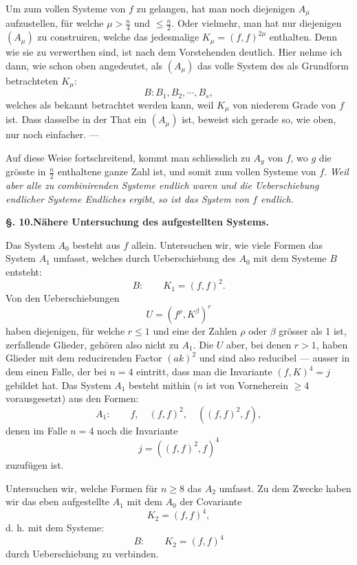 \documentclass[10pt]{article}
\providecommand{\bdots}{\cdots}
\begin{document}
Um zum vollen Systeme von $f$ zu gelangen, hat man noch diejenigen $A_\mu$ aufzustellen, für welche $\mu>\frac n4$ und $\leq\frac n2$. Oder vielmehr, man hat nur diejenigen $(A_\mu)$ zu construiren, welche das jedesmalige $K_\mu=(f,f)^{2\mu}$ enthalten. Denn wie sie zu verwerthen sind, ist nach dem Vorstehenden deutlich. Hier nehme ich dann, wie schon oben angedeutet, als $(A_\mu)$ das volle System des als Grundform betrachteten $K_\mu$:
\[
B:B_1,B_2,\bdots,B_s,
\]
welches als bekannt betrachtet werden kann, weil $K_\mu$ von niederem Grade von $f$ ist. Dass dasselbe in der That ein $(A_\mu)$ ist, beweist sich gerade so, wie oben, nur noch einfacher. ---

Auf diese Weise fortschreitend, kommt man schliesslich zu $A_g$ von $f$, wo $g$ die grösste in $\frac n2$ enthaltene ganze Zahl ist, und somit zum vollen Systeme von $f$. \textit{Weil aber alle zu combinirenden Systeme endlich waren und die Ueberschiebung endlicher Systeme Endliches ergibt, so ist das System von $f$ endlich.}

\begin{center}
{\bfseries §. 10.\quad Nähere Untersuchung des aufgestellten Systems.}
\end{center}

Das System $A_0$ besteht aus $f$ allein. Untersuchen wir, wie viele Formen das System $A_1$ umfasst, welches durch Ueberschiebung des $A_0$ mit dem Systeme $B$ entsteht:
\[
B:
\qquad K_1=(f,f)^2.
\]
Von den Ueberschiebungen
\[
U=(f^\rho,K^\beta)^r
\]
haben diejenigen, für welche $r\leq 1$ und eine der Zahlen $\rho$ oder $\beta$ grösser als 1 ist, zerfallende Glieder, gehören also nicht zu $A_1$. Die $U$ aber, bei denen $r>1$, haben Glieder mit dem reducirenden Factor $(ak)^2$ und sind also reducibel --- ausser in dem einen Falle, der bei $n=4$ eintritt, dass man die Invariante $(f,K)^4=j$ gebildet hat. Das System $A_1$ besteht mithin ($n$ ist von Vorneherein $\geq 4$ vorausgesetzt) aus den Formen:
\[
A_1:
\qquad f,
\quad (f,f)^2,
\quad ((f,f)^2,f),
\]
denen im Falle $n=4$ noch die Invariante
\[
j=((f,f)^2,f)^4
\]
zuzufügen ist.

Untersuchen wir, welche Formen für $n\geq 8$ das $A_2$ umfasst. Zu dem Zwecke haben wir das eben aufgestellte $A_1$ mit dem $A_0$ der Covariante
\[
K_2=(f,f)^4,
\]
d. h. mit dem Systeme:
\[
B:
\qquad K_2=(f,f)^4
\]
durch Ueberschiebung zu verbinden.
\end{document}

